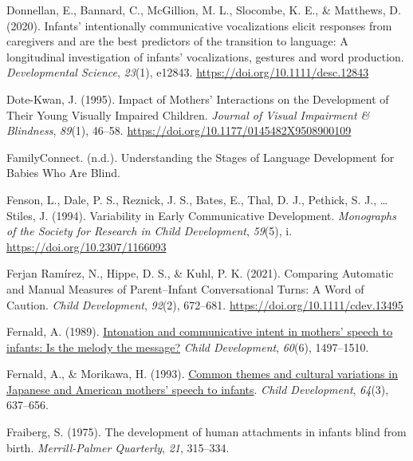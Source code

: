 \documentclass[
  man]{apa6}
\newlength{\cslhangindent}
\newlength{\cslentryspacingunit} %
\newenvironment{CSLReferences}[2] %
 {%
  \setlength{\parindent}{0pt}
  \ifodd #1
  \let\oldpar\par
  \def\par{\hangindent=\cslhangindent\oldpar}
  \fi
  \setlength{\parskip}{#2\cslentryspacingunit}
 }%
 {}
\begin{document}
\begin{CSLReferences}{1}{0}
\leavevmode{}%
Donnellan, E., Bannard, C., McGillion, M. L., Slocombe, K. E., \& Matthews, D. (2020). Infants' intentionally communicative vocalizations elicit responses from caregivers and are the best predictors of the transition to language: {A} longitudinal investigation of infants' vocalizations, gestures and word production. \emph{Developmental Science}, \emph{23}(1), e12843. \url{https://doi.org/10.1111/desc.12843}

\leavevmode{}%
Dote-Kwan, J. (1995). Impact of {Mothers}' {Interactions} on the {Development} of {Their Young Visually Impaired Children}. \emph{Journal of Visual Impairment \& Blindness}, \emph{89}(1), 46--58. \url{https://doi.org/10.1177/0145482X9508900109}

\leavevmode{}%
FamilyConnect. (n.d.). Understanding the {Stages} of {Language Development} for {Babies Who Are Blind}.

\leavevmode{}%
Fenson, L., Dale, P. S., Reznick, J. S., Bates, E., Thal, D. J., Pethick, S. J., \ldots{} Stiles, J. (1994). Variability in {Early Communicative Development}. \emph{Monographs of the Society for Research in Child Development}, \emph{59}(5), i. \url{https://doi.org/10.2307/1166093}

\leavevmode{}%
Ferjan Ramírez, N., Hippe, D. S., \& Kuhl, P. K. (2021). Comparing {Automatic} and {Manual Measures} of {Parent}--{Infant Conversational Turns}: {A Word} of {Caution}. \emph{Child Development}, \emph{92}(2), 672--681. \url{https://doi.org/10.1111/cdev.13495}

\leavevmode{}%
Fernald, A. (1989). \href{https://www.ncbi.nlm.nih.gov/pubmed/2612255}{Intonation and communicative intent in mothers' speech to infants: Is the melody the message?} \emph{Child Development}, \emph{60}(6), 1497--1510.

\leavevmode{}%
Fernald, A., \& Morikawa, H. (1993). \href{https://www.ncbi.nlm.nih.gov/pubmed/8339686}{Common themes and cultural variations in {Japanese} and {American} mothers' speech to infants}. \emph{Child Development}, \emph{64}(3), 637--656.

\leavevmode{}%
Fraiberg, S. (1975). The development of human attachments in infants blind from birth. \emph{Merrill-Palmer Quarterly}, \emph{21}, 315--334.


\end{CSLReferences}
\end{document}
